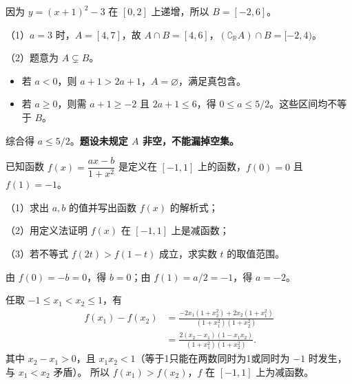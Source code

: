 \begin{frame}
因为 $y=(x+1)^2-3$ 在 $[0,2]$ 上递增，所以 $B=[-2,6]$。
\par\vspace{2mm}
（1）$a=3$ 时，$A=[4,7]$，故 $A\cap B=[4,6]$，$(\complement_{\mathbb R}A)\cap B=[-2,4)$。
\pause
\par\vspace{3mm}
（2）题意为 $A\subsetneq B$。
\begin{itemize}
\item 若 $a<0$，则 $a+1>2a+1$，$A=\varnothing$，满足真包含。
\item 若 $a\ge0$，则需 $a+1\ge-2$ 且 $2a+1\le6$，得 $0\le a\le5/2$。这些区间均不等于 $B$。
\end{itemize}
综合得 $a\le5/2$。\textbf{题设未规定 $A$ 非空，不能漏掉空集。}
\end{frame}

\begin{frame}
已知函数 $f(x)=\dfrac{ax-b}{1+x^2}$ 是定义在 $[-1,1]$ 上的函数，$f(0)=0$ 且 $f(1)=-1$。
\par\vspace{3mm}
（1）求出 $a,b$ 的值并写出函数 $f(x)$ 的解析式；\par
（2）用定义法证明 $f(x)$ 在 $[-1,1]$ 上是减函数；\par
（3）若不等式 $f(2t)>f(1-t)$ 成立，求实数 $t$ 的取值范围。
\pause
\Answer{（1）$a=-2,b=0$，$f(x)=-\dfrac{2x}{1+x^2}$（$x\in[-1,1]$）；\par
（2）证明见下一页；\quad（3）$t\in[0,1/3)$。}
\end{frame}

\begin{frame}
由 $f(0)=-b=0$，得 $b=0$；由 $f(1)=a/2=-1$，得 $a=-2$。
\par\vspace{3mm}
任取 $-1\le x_1<x_2\le1$，有
\begin{align*}
f(x_1)-f(x_2)
&=\frac{-2x_1(1+x_2^2)+2x_2(1+x_1^2)}{(1+x_1^2)(1+x_2^2)}\\
&=\frac{2(x_2-x_1)(1-x_1x_2)}{(1+x_1^2)(1+x_2^2)}.
\end{align*}
其中 $x_2-x_1>0$，且 $x_1x_2<1$（等于1只能在两数同时为1或同时为 $-1$ 时发生，与 $x_1<x_2$ 矛盾）。
所以 $f(x_1)>f(x_2)$，$f$ 在 $[-1,1]$ 上为减函数。
\end{frame}

